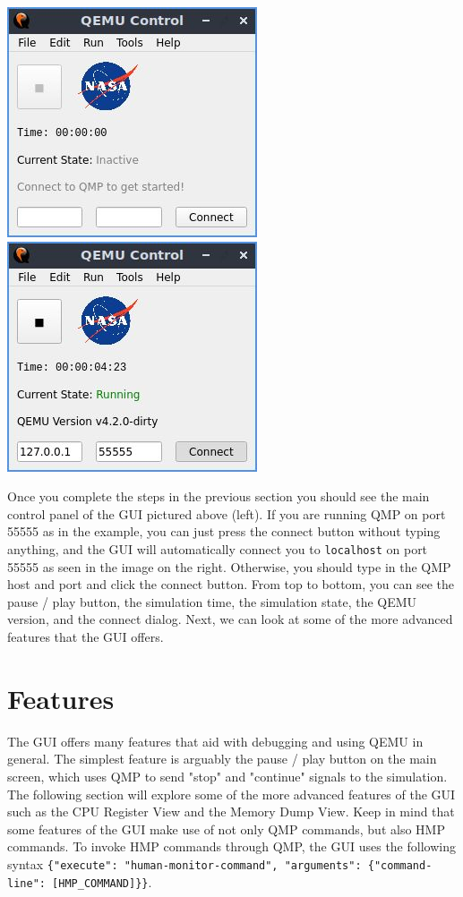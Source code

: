 \documentclass{article}
\newcommand{\code}[1]{\texttt{#1}}
\begin{document}
\begin{center}
    \includegraphics[]{images/main_inactive.jpg}
    \includegraphics[]{images/main_active.jpg}
\end{center}
Once you complete the steps in the previous section you should see the main control panel of the GUI pictured above (left). If you are running QMP on port 55555 as in the example, you can just press the connect button without typing anything, and the GUI will automatically connect you to \code{localhost} on port 55555 as seen in the image on the right. Otherwise, you should type in the QMP host and port and click the connect button. From top to bottom, you can see the pause / play button, the simulation time, the simulation state, the QEMU version, and the connect dialog. Next, we can look at some of the more advanced features that the GUI offers.

\section{Features}
The GUI offers many features that aid with debugging and using QEMU in general. The simplest feature is arguably the pause / play button on the main screen, which uses QMP to send "stop" and "continue" signals to the simulation. The following section will explore some of the more advanced features of the GUI such as the CPU Register View and the Memory Dump View. Keep in mind that some features of the GUI make use of not only QMP commands, but also HMP commands. To invoke HMP commands through QMP, the GUI uses the following syntax \code{\{"execute": "human-monitor-command", "arguments": \{"command-line": [HMP\_COMMAND]\}\}}.
\end{document}
